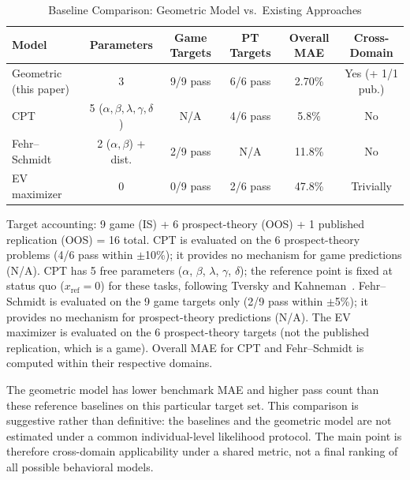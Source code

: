\documentclass[journal]{IEEEtran}
\begin{document}
\begin{table}[!t]
\renewcommand{\arraystretch}{1.2}
\caption{Baseline Comparison: Geometric Model vs.\ Existing Approaches}
\label{tab:comparison}
\centering
\begin{tabular}{l c c c c c}
\toprule
\textbf{Model} & \textbf{Parameters} & \textbf{Game Targets} & \textbf{PT Targets} & \textbf{Overall MAE} & \textbf{Cross-Domain} \\
\midrule
Geometric (this paper) & 3 & 9/9 pass & 6/6 pass & 2.70\% & Yes (+ 1/1 pub.) \\
CPT~\cite{tversky1992} & 5 ($\alpha,\beta,\lambda,\gamma,\delta$) & N/A & 4/6 pass & 5.8\% & No \\
Fehr--Schmidt~\cite{fehr1999} & 2 ($\alpha,\beta$) + dist. & 2/9 pass & N/A & 11.8\% & No \\
EV maximizer & 0 & 0/9 pass & 2/6 pass & 47.8\% & Trivially \\
\bottomrule
\end{tabular}
\begin{flushleft}
\footnotesize{Target accounting: 9 game (IS) + 6 prospect-theory (OOS) + 1 published replication (OOS) = 16 total.
CPT is evaluated on the 6 prospect-theory problems (4/6 pass within $\pm$10\%); it provides no mechanism for game predictions (N/A).
CPT has 5 free parameters ($\alpha$, $\beta$, $\lambda$, $\gamma$, $\delta$); the reference point is fixed at status quo ($x_{\text{ref}} = 0$) for these tasks, following Tversky and Kahneman~\cite{tversky1992}.
Fehr--Schmidt is evaluated on the 9 game targets only (2/9 pass within $\pm$5\%); it provides no mechanism for prospect-theory predictions (N/A).
The EV maximizer is evaluated on the 6 prospect-theory targets (not the published replication, which is a game).
Overall MAE for CPT and Fehr--Schmidt is computed within their respective domains.}
\end{flushleft}
\end{table}

The geometric model has lower benchmark MAE and higher pass count than these reference baselines on this particular target set. This comparison is suggestive rather than definitive: the baselines and the geometric model are not estimated under a common individual-level likelihood protocol. The main point is therefore cross-domain applicability under a shared metric, not a final ranking of all possible behavioral models.
\end{document}
